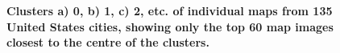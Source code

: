 \documentclass[final,3p,times,authoryear]{elsarticle}
\begin{document}
\begin{figure}[!htbp]
\centering    
\caption{\bf Clusters a) 0, b) 1, c) 2, etc. of individual maps from 135 United States cities, showing only the top 60 map images closest to the centre of the clusters.}    
 \label{fig:clustermapsimages}  
\end{figure} 

%
\end{document}

